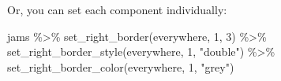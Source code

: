 \documentclass[
]{article}
\newenvironment{Shaded}{\begin{snugshade}}{\end{snugshade}}
\newcommand{\DecValTok}[1]{\textcolor[rgb]{0.00,0.00,0.81}{#1}}
\newcommand{\FunctionTok}[1]{\textcolor[rgb]{0.00,0.00,0.00}{#1}}
\newcommand{\NormalTok}[1]{#1}
\newcommand{\SpecialCharTok}[1]{\textcolor[rgb]{0.00,0.00,0.00}{#1}}
\newcommand{\StringTok}[1]{\textcolor[rgb]{0.31,0.60,0.02}{#1}}
\begin{document}
\FloatBarrier

Or, you can set each component individually:

\begin{Shaded}
\begin{Highlighting}[]
\NormalTok{jams }\SpecialCharTok{\%\textgreater{}\%} 
      \FunctionTok{set\_right\_border}\NormalTok{(everywhere, }\DecValTok{1}\NormalTok{, }\DecValTok{3}\NormalTok{) }\SpecialCharTok{\%\textgreater{}\%} 
      \FunctionTok{set\_right\_border\_style}\NormalTok{(everywhere, }\DecValTok{1}\NormalTok{, }\StringTok{"double"}\NormalTok{) }\SpecialCharTok{\%\textgreater{}\%} 
      \FunctionTok{set\_right\_border\_color}\NormalTok{(everywhere, }\DecValTok{1}\NormalTok{, }\StringTok{"grey"}\NormalTok{)}
\end{Highlighting}
\end{Shaded}

 
  \providecommand{\huxb}[2]{\arrayrulecolor[RGB]{#1}\global\arrayrulewidth=#2pt}
  \providecommand{\huxvb}[2]{\color[RGB]{#1}\vrule width #2pt}
  \providecommand{\huxtpad}[1]{\rule{0pt}{#1}}
  \providecommand{\huxbpad}[1]{\rule[-#1]{0pt}{#1}}
\end{document}
